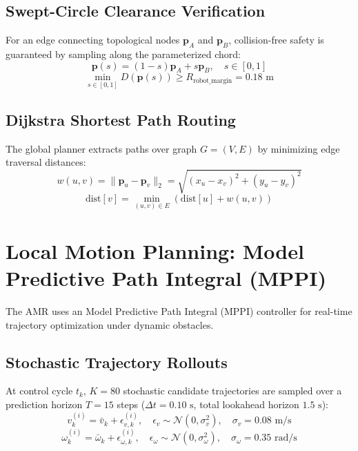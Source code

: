\documentclass[10pt,a4paper]{article}
\begin{document}
\subsection{Swept-Circle Clearance Verification}
For an edge connecting topological nodes $\mathbf{p}_A$ and $\mathbf{p}_B$, collision-free safety is guaranteed by sampling along the parameterized chord:
\begin{equation}
\mathbf{p}(s) = (1 - s)\mathbf{p}_A + s\mathbf{p}_B, \quad s \in [0, 1]
\end{equation}
\begin{equation}
\min_{s \in [0, 1]} D(\mathbf{p}(s)) \ge R_{\text{robot\_margin}} = 0.18\text{ m}
\end{equation}

\subsection{Dijkstra Shortest Path Routing}
The global planner extracts paths over graph $G = (V, E)$ by minimizing edge traversal distances:
\begin{equation}
w(u, v) = \|\mathbf{p}_u - \mathbf{p}_v\|_2 = \sqrt{(x_u - x_v)^2 + (y_u - y_v)^2}
\end{equation}
\begin{equation}
\text{dist}[v] = \min_{(u, v) \in E} \left( \text{dist}[u] + w(u, v) \right)
\end{equation}

\section{Local Motion Planning: Model Predictive Path Integral (MPPI)}

The AMR uses an Model Predictive Path Integral (MPPI) controller for real-time trajectory optimization under dynamic obstacles.

\subsection{Stochastic Trajectory Rollouts}
At control cycle $t_k$, $K = 80$ stochastic candidate trajectories are sampled over a prediction horizon $T = 15$ steps ($\Delta t = 0.10\text{ s}$, total lookahead horizon $1.5\text{ s}$):
\begin{equation}
v_k^{(i)} = \bar{v}_k + \epsilon_{v, k}^{(i)}, \quad \epsilon_v \sim \mathcal{N}(0, \sigma_v^2), \quad \sigma_v = 0.08\text{ m/s}
\end{equation}
\begin{equation}
\omega_k^{(i)} = \bar{\omega}_k + \epsilon_{\omega, k}^{(i)}, \quad \epsilon_\omega \sim \mathcal{N}(0, \sigma_\omega^2), \quad \sigma_\omega = 0.35\text{ rad/s}
\end{equation}
\end{document}
